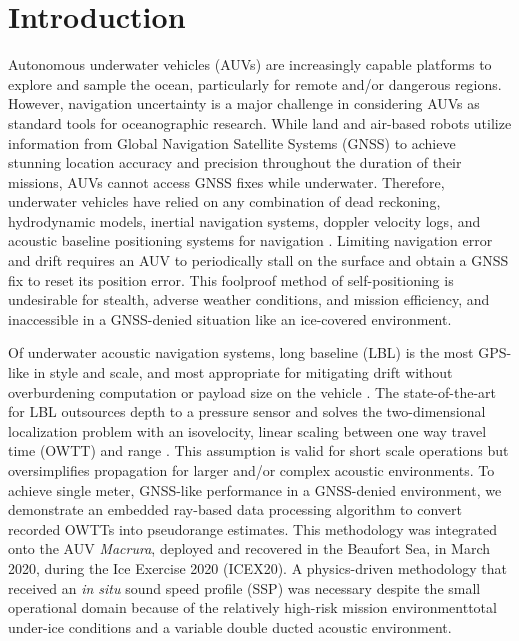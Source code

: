 
\maketitle


\section{Introduction}
\label{sec:1}  
Autonomous underwater vehicles (AUVs) are increasingly capable platforms to explore and sample the ocean, particularly for remote and/or dangerous regions.
However, navigation uncertainty is a major challenge in considering AUVs as standard tools for oceanographic research.
While land and air-based robots utilize information from Global Navigation Satellite Systems (GNSS) to achieve stunning location accuracy and precision throughout the duration of their missions, AUVs cannot access GNSS fixes while underwater.
Therefore, underwater vehicles have relied on any combination of dead reckoning, hydrodynamic models, inertial navigation systems, doppler velocity logs, and acoustic baseline positioning systems for navigation \citep{paull_auv_2014}.
Limiting navigation error and drift requires an AUV to periodically stall on the surface and obtain a GNSS fix to reset its position error.
This foolproof method of self-positioning is undesirable for stealth, adverse weather conditions, and mission efficiency, and inaccessible in a GNSS-denied situation like an ice-covered environment.

Of underwater acoustic navigation systems, long baseline (LBL) is the most GPS-like in style and scale, and most appropriate for mitigating drift without overburdening computation or payload size on the vehicle \citep{van_uffelen_global_2021}.
The state-of-the-art for LBL outsources depth to a pressure sensor and solves the two-dimensional localization problem with an isovelocity, linear scaling between one way travel time (OWTT) and range \citep{Eustice2006,Eustice2007,webster_advances_2012,Webster2009}.
This assumption is valid for short scale operations but oversimplifies propagation for larger and/or complex acoustic environments.
To achieve single meter, GNSS-like performance in a GNSS-denied environment, we demonstrate an embedded ray-based data processing algorithm to convert recorded OWTTs into pseudorange estimates.
This methodology was integrated onto the AUV \emph{Macrura}, deployed and recovered in the Beaufort Sea, in March 2020, during the Ice Exercise 2020 (ICEX20).
A physics-driven methodology that received an \textit{in situ} sound speed profile (SSP) was necessary despite the small operational domain because of the relatively high-risk mission environment\textemdash total under-ice conditions and a variable double ducted acoustic environment.

